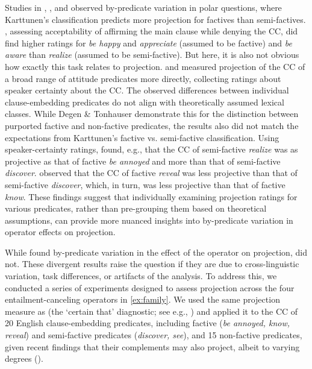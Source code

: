 \documentclass[a4paper,12pt,twoside]{article}
\begin{document}
	Studies in \citet{djarv_cognitive_2018}, \citet{tonhauser_how_2018}, and \citet{degen_are_2022} observed by-predicate variation in polar questions, where Karttunen's classification predicts more projection for factives than semi-factives.
	\citet{djarv_cognitive_2018}, assessing acceptability of affirming the main clause while denying the CC, did find higher ratings for \emph{be happy} and \emph{appreciate} (assumed to be factive) and \emph{be aware} than \emph{realize} (assumed to be semi-factive). But here, it is also not obvious how exactly this task relates to projection.
	\citet{tonhauser_how_2018} and \citet{degen_are_2022} measured projection of the CC of a broad range of attitude predicates more directly, collecting ratings about speaker certainty about the CC. The observed differences between individual clause-embedding predicates do not align with theoretically assumed lexical classes. While Degen \& Tonhauser demonstrate this for the distinction between purported factive and non-factive predicates, the results also did not match the expectations from Karttunen's factive vs. semi-factive classification.
	Using speaker-certainty ratings, \citet{tonhauser_how_2018} found, e.g., that the CC of semi-factive \emph{realize} was as projective as that of factive \emph{be annoyed} and more than that of semi-factive \emph{discover}. \citet{degen_are_2022} observed that the CC of factive \textit{reveal} was less projective than that of semi-factive \textit{discover}, which, in turn, was less projective than that of factive \textit{know}. These findings suggest that individually examining projection ratings for various predicates, rather than pre-grouping them based on theoretical assumptions, can provide more nuanced insights into by-predicate variation in operator effects on projection.


	While \citet{smith_relationship_2014} found by-predicate variation in the effect of the operator on projection, \citet{sieker_projective_2022} did not.
	These divergent results raise the question if they are due to cross-linguistic variation, task differences, or artifacts of the analysis. To address this, we conducted a series of experiments designed to assess projection across the four entailment-canceling operators in \ref{ex:family}. We used the same projection measure as \citet{sieker_projective_2022} (the `certain that' diagnostic; see e.g., \citealp{tonhauser_how_2018,djarv_prosodic_2017,mahler_social_2020}) and applied it to the CC of 20 English clause-embedding predicates, including factive (\emph{be annoyed, know, reveal}) and semi-factive predicates (\emph{discover, see}), and 15 non-factive predicates, given recent findings that their complements may also project, albeit to varying degrees (\citealt{degen_are_2022}).
\end{document}
